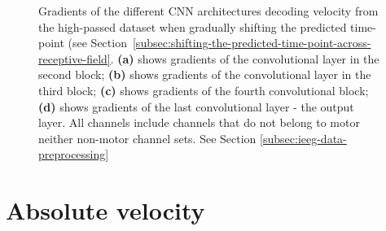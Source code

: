 \begin{figure}[!htpb]
\caption[]{Gradients of the different CNN architectures decoding velocity from the high-passed dataset when gradually shifting the predicted time-point (see Section~\ref{subsec:shifting-the-predicted-time-point-across-receptive-field}. \textbf{(a)} shows gradients of the convolutional layer in the second block; \textbf{(b)} shows gradients of the convolutional layer in the third block; \textbf{(c)} shows gradients of the fourth convolutional block; \textbf{(d)} shows gradients of the last convolutional layer - the output layer. All channels include channels that do not belong to motor neither non-motor channel sets. See Section \ref{subsec:ieeg-data-preprocessing}}
\label{fig:vel-hp-shifting-grads}
\end{figure}
\clearpage
\section*{Absolute velocity}\label{sec:absolute-velocity-appendixC}

